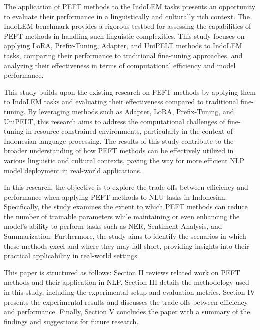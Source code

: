 The application of PEFT methods to the IndoLEM tasks presents an opportunity to evaluate their performance in a linguistically and culturally rich context. The IndoLEM benchmark provides a rigorous testbed for assessing the capabilities of PEFT methods in handling such linguistic complexities. This study focuses on applying LoRA, Prefix-Tuning, Adapter, and UniPELT methods to IndoLEM tasks, comparing their performance to traditional fine-tuning approaches, and analyzing their effectiveness in terms of computational efficiency and model performance.

This study builds upon the existing research on PEFT methods by applying them to IndoLEM tasks and evaluating their effectiveness compared to traditional fine-tuning. By leveraging methods such as Adapter, LoRA, Prefix-Tuning, and UniPELT, this research aims to address the computational challenges of fine-tuning in resource-constrained environments, particularly in the context of Indonesian language processing. The results of this study contribute to the broader understanding of how PEFT methods can be effectively utilized in various linguistic and cultural contexts, paving the way for more efficient NLP model deployment in real-world applications.

In this research, the objective is to explore the trade-offs between efficiency and performance when applying PEFT methods to NLU tasks in Indonesian. Specifically, the study examines the extent to which PEFT methods can reduce the number of trainable parameters while maintaining or even enhancing the model's ability to perform tasks such as NER, Sentiment Analysis, and Summarization. Furthermore, the study aims to identify the scenarios in which these methods excel and where they may fall short, providing insights into their practical applicability in real-world settings.

This paper is structured as follows: Section II reviews related work on PEFT methods and their application in NLP. Section III details the methodology used in this study, including the experimental setup and evaluation metrics. Section IV presents the experimental results and discusses the trade-offs between efficiency and performance. Finally, Section V concludes the paper with a summary of the findings and suggestions for future research.
